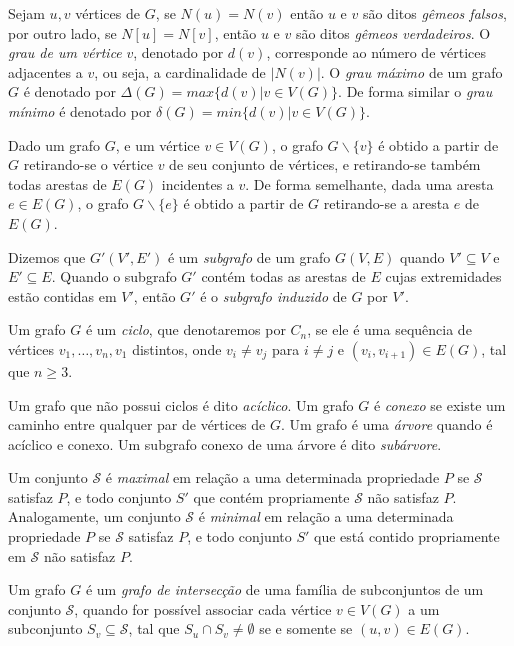 Sejam $u, v$ vértices de $G$, se $N(u) = N(v)$ então $u$ e $v$ são ditos \emph{gêmeos falsos}, por outro lado, se $N[u] = N[v]$, então $u$ e $v$ são ditos \emph{gêmeos verdadeiros}. O \emph{grau de um vértice} $v$, denotado por $d(v)$, corresponde ao número de vértices adjacentes a $v$, ou seja, a cardinalidade de $|N(v)|$. O \emph{grau máximo} de um grafo $G$ é denotado por $\Delta(G) = max\{d(v) | v \in V(G)\}$. De forma similar o \emph{grau mínimo} é denotado por $\delta(G) = min\{d(v) | v \in V(G)\}$.

Dado um grafo $G$, e um vértice $v \in V(G)$, o grafo $G\backslash \{v\}$ é obtido a partir de $G$ retirando-se o vértice $v$ de seu conjunto de vértices, e retirando-se também todas arestas de $E(G)$ incidentes a $v$. De forma semelhante, dada uma aresta $e \in E(G)$, o grafo $G\backslash \{e\}$ é obtido a partir de $G$ retirando-se a aresta $e$ de $E(G)$.

Dizemos que $G'(V',E')$ é um \emph{subgrafo} de um grafo $G(V,E)$ quando $V'\subseteq V$ e $E'\subseteq E$. Quando o subgrafo $G'$ contém todas as arestas de $E$ cujas extremidades estão contidas em $V'$, então $G'$ é o \emph{subgrafo induzido} de $G$ por $V'$.  

Um grafo $G$ é um \emph{ciclo}, que denotaremos por $C_n$, se ele é uma sequência de vértices   $v_1, \dots, v_n, v_1$ distintos, onde $v_i \neq v_j$ para $i\neq j$ e $(v_i, v_{i+1})\in E(G)$,  tal que $n\geq 3$. 

Um grafo que não possui ciclos é dito \emph{acíclico}. Um grafo $G$ é \emph{conexo} se existe um caminho entre qualquer par de vértices de $G$. Um grafo é uma \emph{árvore} quando é acíclico e conexo. Um subgrafo conexo de uma árvore é dito \emph{subárvore}.

Um conjunto $\mathcal{S}$ é \emph{maximal} em relação a uma determinada propriedade $P$ se $\mathcal{S}$ satisfaz $P$, e todo conjunto $S'$ que contém propriamente $\mathcal{S}$ não satisfaz $P$. Analogamente, um conjunto $\mathcal{S}$ é \emph{minimal} em relação a uma determinada propriedade $P$ se $\mathcal{S}$ satisfaz $P$, e todo conjunto $S'$ que está contido propriamente em $\mathcal{S}$ não satisfaz $P$.

Um grafo $G$ é um \emph{grafo de intersecção} de uma família de subconjuntos de um conjunto $\mathcal{S}$, quando for possível associar cada vértice $v \in V(G)$ a um subconjunto $S_v \subseteq \mathcal{S}$, tal que $S_u \cap S_v \neq \emptyset$ se e somente se $(u,v)\in E(G)$. 


